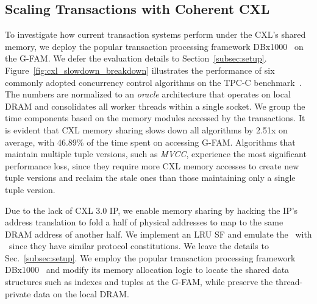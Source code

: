 







\subsection{Scaling Transactions with Coherent CXL} \label{subsec:vanilla_primitive}


To investigate how current transaction systems perform under the CXL's shared memory, we deploy the popular transaction processing framework DBx1000~\cite{abyss_vldb14} on the G-FAM. We defer the evaluation details to Section~\ref{subsec:setup}. Figure~\ref{fig:cxl_slowdown_breakdown} illustrates the performance of six commonly adopted concurrency control algorithms on the TPC-C benchmark~\cite{tpc-c}. The numbers are normalized to an \textit{oracle} architecture that operates on local DRAM and consolidates all worker threads within a single socket. We group the time components based on the memory modules accessed by the transactions. It is evident that CXL memory sharing slows down all algorithms by 2.51x on average, with 46.89\% of the time spent on accessing G-FAM.
Algorithms that maintain multiple tuple versions, such as \textit{MVCC}, experience the most significant performance loss, since they require more CXL memory accesses to create new tuple versions and reclaim the stale ones than those maintaining only a single tuple version. 


\ifx\undefined\stale
Due to the lack of CXL 3.0 IP, we enable memory sharing by hacking the IP's address translation to fold a half of physical addresses to map to the same DRAM address of another half. We implement an LRU SF and emulate the \cxlbi~with \cxlcache~since they have similar protocol constitutions. We leave the details to Sec.~\ref{subsec:setup}. We employ the popular transaction processing framework DBx1000~\cite{abyss_vldb14} and modify its memory allocation logic to locate the shared data structures such as indexes and tuples at the G-FAM, while preserve the thread-private data on the local DRAM. 
\fi

